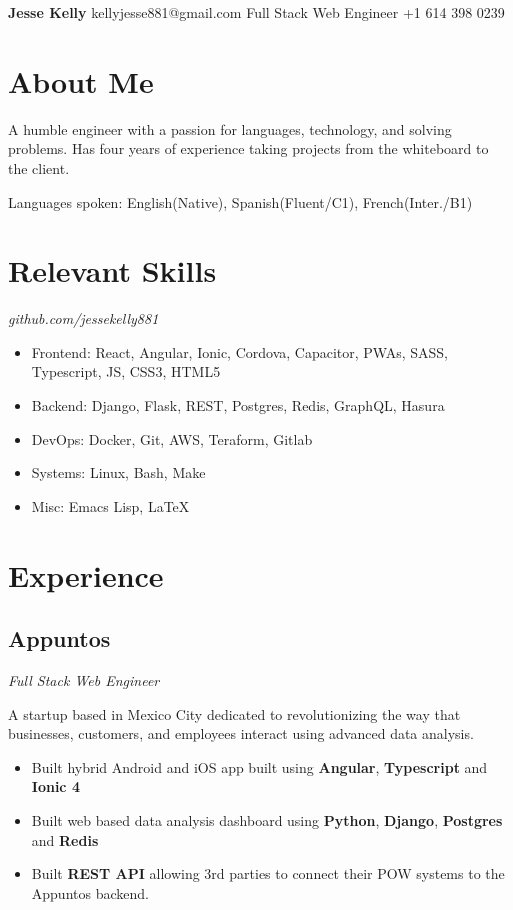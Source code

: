 \documentclass[letterpaper,11pt]{article}
\begin{document}
\begin{flushleft}
\Large{\textbf{Jesse Kelly}}
\hfill
kellyjesse881@gmail.com
\newline
Full Stack Web Engineer
\hfill
+1 614 398 0239
\end{flushleft}

\section{About Me}
A humble engineer with a passion for languages, technology, and solving problems.
Has four years of experience taking projects from the whiteboard to the client.

\vspace{2mm}
Languages spoken: English(Native), Spanish(Fluent/C1), French(Inter./B1)

\section{Relevant Skills}
\textit{github.com/jessekelly881}
\begin{itemize}
\setlength\itemsep{0em}
\item Frontend: React, Angular, Ionic, Cordova, Capacitor, PWAs, SASS, Typescript, JS, CSS3, HTML5
\item Backend: Django, Flask, REST, Postgres, Redis, GraphQL, Hasura
\item DevOps: Docker, Git, AWS, Teraform, Gitlab
\item Systems: Linux, Bash, Make
\item Misc: Emacs Lisp, \LaTeX
\end{itemize}

\section{Experience}
\subsection{Appuntos}
\textit{Full Stack Web Engineer}
\vspace{2mm}
\begin{adjustwidth}{1cm}{1cm}
  A startup based in Mexico City dedicated to revolutionizing the way that businesses, customers,
  and employees interact using advanced data analysis.

\begin{itemize}
\item Built hybrid Android and iOS app built using \textbf{Angular}, \textbf{Typescript} and \textbf{Ionic 4}
\item Built web based data analysis dashboard using \textbf{Python}, \textbf{Django}, \textbf{Postgres} and \textbf{Redis}
\item Built \textbf{REST API} allowing 3rd parties to connect their POW systems to the Appuntos backend.
\end{itemize}

\end{adjustwidth}
\end{document}
